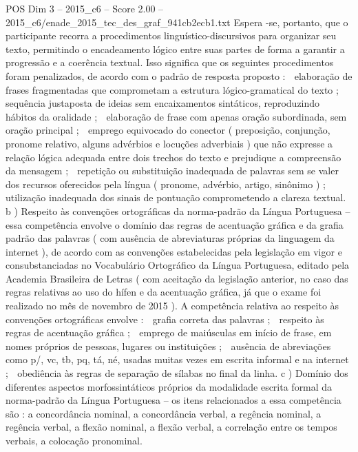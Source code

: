 \begin{textsample}{POS Dim 3 – 2015\_c6 – Score 2.00 – 2015\_c6/enade\_2015\_tec\_des\_graf\_941cb2ecb1.txt}
Espera -se, portanto, que o participante recorra a procedimentos linguístico-discursivos para organizar seu texto, permitindo o encadeamento lógico entre suas partes de forma a garantir a progressão e a coerência textual.
Isso significa que os seguintes procedimentos foram penalizados, de acordo com o padrão de resposta proposto :  elaboração de frases fragmentadas que comprometam a estrutura lógico-gramatical do texto ;  sequência justaposta de ideias sem encaixamentos sintáticos, reproduzindo hábitos da oralidade ;  elaboração de frase com apenas oração subordinada, sem oração principal ;  emprego equivocado do conector ( preposição, conjunção, pronome relativo, alguns advérbios e locuções adverbiais ) que não expresse a relação lógica adequada entre dois trechos do texto e prejudique a compreensão da mensagem ;  repetição ou substituição inadequada de palavras sem se valer dos recursos oferecidos pela língua ( pronome, advérbio, artigo, sinônimo ) ;  utilização inadequada dos sinais de pontuação comprometendo a clareza textual. b ) Respeito às convenções ortográficas da norma-padrão da Língua Portuguesa – essa competência envolve o domínio das regras de acentuação gráfica e da grafia padrão das palavras ( com ausência de abreviaturas próprias da linguagem da internet ), de acordo com as convenções estabelecidas pela legislação em vigor e consubstanciadas no Vocabulário Ortográfico da Língua Portuguesa, editado pela Academia Brasileira de Letras ( com aceitação da legislação anterior, no caso das regras relativas ao uso do hífen e da acentuação gráfica, já que o exame foi realizado no mês de novembro de 2015 ).
A competência relativa ao respeito às convenções ortográficas envolve :  grafia correta das palavras ;  respeito às regras de acentuação gráfica ;  emprego de maiúsculas em início de frase, em nomes próprios de pessoas, lugares ou instituições ;  ausência de abreviações como p/, vc, tb, pq, tá, né, usadas muitas vezes em escrita informal e na internet ;  obediência às regras de separação de sílabas no final da linha. c ) Domínio dos diferentes aspectos morfossintáticos próprios da modalidade escrita formal da norma-padrão da Língua Portuguesa – os itens relacionados a essa competência são : a concordância nominal, a concordância verbal, a regência nominal, a regência verbal, a flexão nominal, a flexão verbal, a correlação entre os tempos verbais, a colocação pronominal.

\end{textsample}
